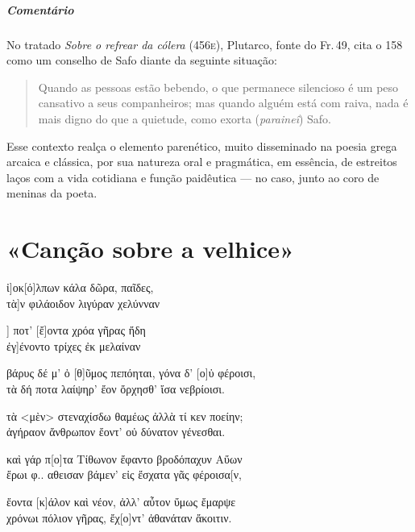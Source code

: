 \medskip

{\paragraph{Comentário} No tratado \emph{Sobre o refrear da cólera} (456\textsc{e}), Plutarco, fonte do Fr.\,49, cita o 158 como um conselho de Safo diante da seguinte situação:

\begin{quote}
Quando as pessoas estão bebendo, o que permanece silencioso é um peso
cansativo a seus companheiros; mas quando alguém está com raiva, nada é mais
digno do que a quietude, como exorta (\emph{paraineî}) Safo. 
\end{quote}}

Esse contexto realça o elemento parenético, muito disseminado na poesia grega arcaica e clássica, por sua natureza oral e pragmática, em essência, de estreitos laços com a vida cotidiana e função paidêutica --- no caso, junto ao coro de meninas da poeta.

\chapter{«Canção sobre a velhice»}



\begin{gkverse}
ἰ]οκ[ό]λπων κάλα δῶρα, παῖδες,\\
        τὰ]ν φιλάοιδον λιγύραν χελύνναν

] ποτ’ [ἔ]οντα χρόα γῆρας ἤδη\\
         ἐγ]ένοντο τρίχες ἐκ μελαίναν

βάρυς δέ μ’ ὀ [θ]ῦμος πεπόηται, γόνα δ’ [ο]ὐ φέροισι,\\
τὰ δή ποτα λαίψηρ’ ἔον ὄρχησθ’ ἴσα νεβρίοισι.

τὰ <μὲν> στεναχίσδω θαμέως ἀλλὰ τί κεν ποείην;\\
ἀγήραον ἄνθρωπον ἔοντ’ οὐ δύνατον γένεσθαι.

καὶ γάρ π[ο]τα Τίθωνον ἔφαντο βροδόπαχυν Αὔων\\
ἔρωι φ..  αθεισαν βάμεν’ εἰς ἔσχατα γᾶς φέροισα[ν,

ἔοντα [κ]άλον καὶ νέον, ἀλλ’ αὖτον ὔμως ἔμαρψε\\
χρόνωι πόλιον γῆρας, ἔχ[ο]ντ’ ἀθανάταν ἄκοιτιν.
\end{gkverse}



